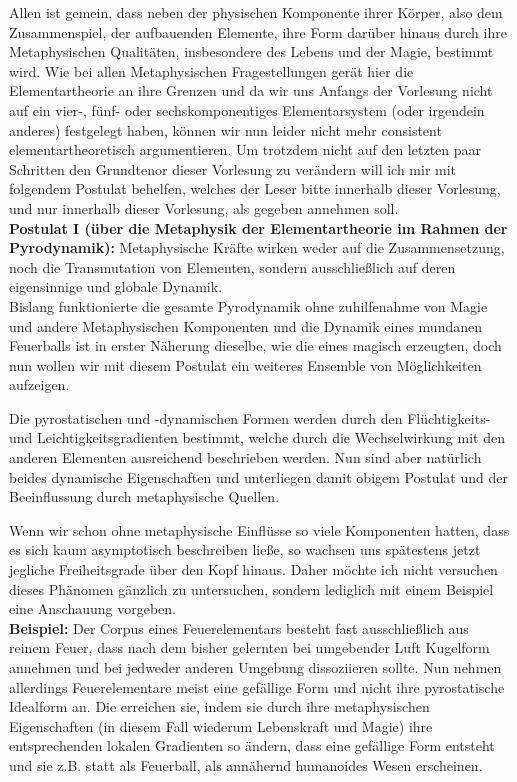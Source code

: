 \documentclass[a5paper,8pt]{book}
\begin{document}
Allen ist gemein, dass neben der physischen Komponente ihrer Körper, also dem Zusammenspiel, der aufbauenden Elemente, 
ihre Form darüber hinaus durch ihre Metaphysischen Qualitäten, insbesondere des Lebens und der Magie, bestimmt wird.
Wie bei allen Metaphysischen Fragestellungen gerät hier die Elementartheorie an ihre Grenzen und da wir uns Anfangs der 
Vorlesung nicht auf ein vier-, fünf- oder sechskomponentiges Elementarsystem (oder irgendein anderes) festgelegt haben, 
können wir nun leider nicht mehr consistent elementartheoretisch argumentieren.
Um trotzdem nicht auf den letzten paar Schritten den Grundtenor dieser Vorlesung zu verändern will ich mir mit folgendem 
Postulat behelfen, welches der Leser bitte innerhalb dieser Vorlesung, und nur innerhalb dieser Vorlesung, als gegeben 
annehmen soll.\\

\textbf{Postulat I (über die Metaphysik der Elementartheorie im Rahmen der Pyrodynamik):}
Metaphysische Kräfte wirken weder auf die Zusammensetzung, noch die Transmutation von Elementen, sondern ausschließlich 
auf deren eigensinnige und globale Dynamik.\\

Bislang funktionierte die gesamte Pyrodynamik ohne zuhilfenahme von Magie und andere Metaphysischen Komponenten und die 
Dynamik eines mundanen Feuerballs ist in erster Näherung dieselbe, wie die eines magisch erzeugten, doch nun wollen wir 
mit diesem Postulat ein weiteres Ensemble von Möglichkeiten aufzeigen.

Die pyrostatischen und -dynamischen Formen werden durch den Flüchtigkeits- und Leichtigkeitsgradienten bestimmt, welche 
durch die Wechselwirkung mit den anderen Elementen ausreichend beschrieben werden. Nun sind aber natürlich beides 
dynamische Eigenschaften und unterliegen damit obigem Postulat und der Beeinflussung durch metaphysische Quellen.

Wenn wir schon ohne metaphysische Einflüsse so viele Komponenten hatten, dass es sich kaum asymptotisch beschreiben ließe, 
so wachsen uns spätestens jetzt jegliche Freiheitsgrade über den Kopf hinaus. Daher möchte ich nicht versuchen dieses 
Phänomen gänzlich zu untersuchen, sondern lediglich mit einem Beispiel eine Anschauung vorgeben.\\

\textbf{Beispiel:}
Der Corpus eines Feuerelementars besteht fast ausschließlich aus reinem Feuer, dass nach dem bisher gelernten bei 
umgebender Luft Kugelform annehmen und bei jedweder anderen Umgebung dissoziieren sollte. Nun nehmen allerdings 
Feuerelementare meist eine gefällige Form und nicht ihre pyrostatische Idealform an. Die erreichen sie, indem sie durch 
ihre metaphysischen Eigenschaften (in diesem Fall wiederum Lebenskraft und Magie) ihre entsprechenden lokalen Gradienten 
so ändern, dass eine gefällige Form entsteht und sie z.B. statt als Feuerball, als annähernd humanoides Wesen erscheinen.
\end{document}
